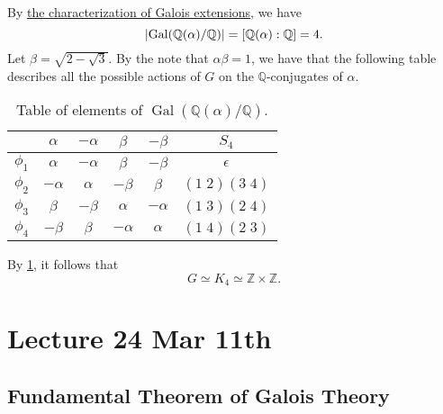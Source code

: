 \documentclass[notoc,notitlepage]{tufte-book}
\DeclareMathOperator{\Gal}{Gal}
\begin{document}
\begin{eg}
  By \hyperref[thm:characterization_of_galois_extensions]{the characterization
  of Galois extensions}, we have
  \begin{equation*}
    \abs{\Gal(\mathbb{Q}(\alpha)/\mathbb{Q})} = [\mathbb{Q}(\alpha) :
    \mathbb{Q}] = 4.
  \end{equation*}
  Let $\beta = \sqrt{2 - \sqrt{3}}$. By the note that $\alpha \beta = 1$, we
  have that the following table describes all the possible actions of $G$ on the
  $\mathbb{Q}$-conjugates of $\alpha$.
  \begin{table}[ht]
    \centering
    \caption{Table of elements of $\Gal(\mathbb{Q}(\alpha)/\mathbb{Q})$.}
    \label{table:table_of_elements_of_gal_q_alpha_q}
    \begin{tabular}{c | c c c c | c}
               & $\alpha$  & $-\alpha$ & $\beta$   & $-\beta$  & $S_4$ \\
      \hline
      $\phi_1$ & $\alpha$  & $-\alpha$ & $\beta$   & $-\beta$  & $\epsilon$ \\
      $\phi_2$ & $-\alpha$ & $\alpha$  & $-\beta$  & $\beta$   & $(1 \; 2)(3 \; 4)$ \\
      $\phi_3$ & $\beta$   & $-\beta$  & $\alpha$  & $-\alpha$ & $(1 \; 3)(2 \; 4)$ \\
      $\phi_4$ & $-\beta$  & $\beta$   & $-\alpha$ & $\alpha$  & $(1 \; 4)(2 \; 3)$
    \end{tabular}
  \end{table}

  By \cref{table:table_of_elements_of_gal_q_alpha_q}, it follows that
  \begin{equation*}
    G \simeq K_4 \simeq \mathbb{Z} \times \mathbb{Z}.
  \end{equation*}
\end{eg}



\chapter{Lecture 24 Mar 11th}%
\label{chp:lecture_24_mar_11th}

\section{Fundamental Theorem of Galois Theory}%
\label{sec:fundamental_theorem_of_galois_theory}
\end{document}
